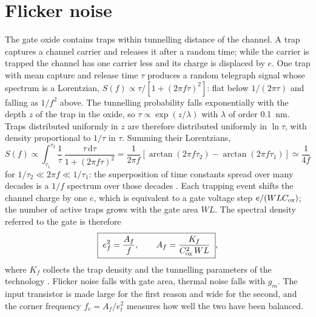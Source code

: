 \documentclass[11pt,a4paper]{article}
\newcommand{\dd}{\mathrm{d}}
\begin{document}
\section{Flicker noise}
\label{sec:flicker}
%
The gate oxide contains traps within tunnelling distance of the channel. A
trap captures a channel carrier and releases it after a random time; while
the carrier is trapped the channel has one carrier less and its charge is
displaced by $e$. One trap with mean capture and release time $\tau$
produces a random telegraph signal whose spectrum is a Lorentzian,
$S(f)\propto\tau/[1+(2\pi f\tau)^2]$: flat below $1/(2\pi\tau)$ and falling
as $1/f^2$ above. The tunnelling probability falls exponentially with the
depth $z$ of the trap in the oxide, so $\tau\propto\exp(z/\lambda)$ with
$\lambda$ of order \SI{0.1}{nm}. Traps distributed uniformly in $z$ are
therefore distributed uniformly in $\ln\tau$, with density proportional to
$1/\tau$ in $\tau$. Summing their Lorentzians,
%
\begin{equation}
 S(f)\propto\int_{\tau_1}^{\tau_2}\frac{1}{\tau}\,
 \frac{\tau\,\dd\tau}{1+(2\pi f\tau)^2}
 =\frac{1}{2\pi f}\left[\arctan(2\pi f\tau_2)-\arctan(2\pi f\tau_1)\right]
 \simeq\frac{1}{4f}
\label{eq:lorentzsum}
\end{equation}
%
for $1/\tau_2\ll 2\pi f\ll 1/\tau_1$: the superposition of time constants
spread over many decades is a $1/f$ spectrum over those decades
\citep{McWhorter1957}. Each trapping event shifts the channel charge by one
$e$, which is equivalent to a gate voltage step $e/(WLC_{\rm ox})$; the
number of active traps grows with the gate area $WL$. The spectral density
referred to the gate is therefore
%
\begin{equation}
 \boxed{\; e_f^2=\frac{A_f}{f},\qquad
 A_f=\frac{K_f}{C_{\rm ox}^2\,WL} \;},
\label{eq:af}
\end{equation}
%
where $K_f$ collects the trap density and the tunnelling parameters of the
technology \citep{Tsividis2011}. Flicker noise falls with gate area, thermal
noise falls with $g_m$. The input transistor is made large for the first
reason and wide for the second, and the corner frequency $f_c=A_f/e_t^2$
measures how well the two have been balanced.



\end{document}
